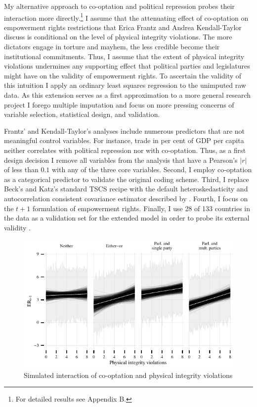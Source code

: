 
My alternative approach to co-optation and political
repression probes their interaction more
directly.\footnote{For detailed results see Appendix B.} I
assume that the attenuating effect of co-optation on
empowerment rights restrictions that Erica Frantz and Andrea
Kendall-Taylor discuss is conditional on the level of
physical integrity violations. The more dictators engage in
torture and mayhem, the less credible become their
institutional commitments. Thus, I assume that the extent of
physical integrity violations undermines any supporting
effect that political parties and legislatures might have
on the validity of empowerment rights. To ascertain the
validity of this intuition I apply an ordinary least
squares regression to the unimputed raw data. As this
extension serves as a first approximation to a more  general
research project I forego multiple imputation and  focus on
more pressing concerns of variable selection,  statistical
design, and validation.

Frantz' and Kendall-Taylor's analyses include numerous 
predictors that are not meaningful control variables. For 
instance, trade in per cent of GDP per capita 
neither correlates with political repression nor with 
co-optation. Thus, as a first design decision I remove all
variables from the analysis that have a Pearson's $|r|$ of 
less than $0.1$ with any of the three core variables. 
Second, I employ co-optation as a categorical predictor to
validate the original coding scheme. Third, I replace Beck's 
and Katz's standard TSCS recipe with the default 
heteroskedasticity and autocorrelation consistent covariance
estimator described by \citet[6]{Zeileis.2004}. Fourth, I 
focus on the $t+1$ formulation of empowerment 
rights. Finally, I use 28 of 133 countries in the data as a 
validation set for the extended model in order to probe its 
external validity \cite[175ff.]{James.2013}.

\begin{figure}[!htb]
  \centering
  \includegraphics[width = \linewidth]{./sections/04extension/spaghettiInteraction.pdf}
  \caption{Simulated interaction of co-optation and physical integrity violations}
  \label{fig:simInteraction}
\end{figure}

